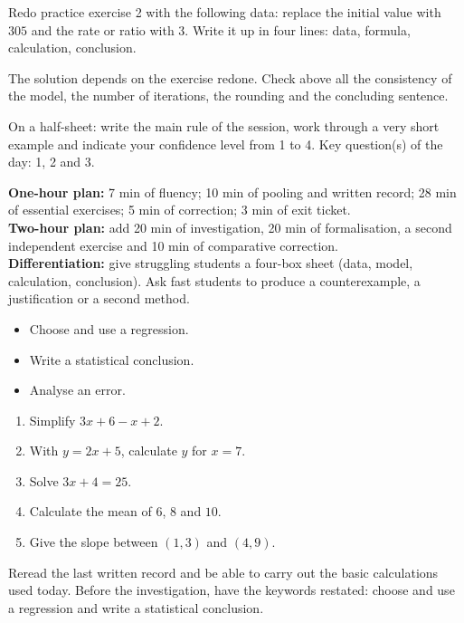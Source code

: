 
\begin{homework}Redo practice exercise 2 with the following data: replace the initial value with $305$ and the rate or ratio with $3$. Write it up in four lines: data, formula, calculation, conclusion.\end{homework}
\begin{solution}The solution depends on the exercise redone. Check above all the consistency of the model, the number of iterations, the rounding and the concluding sentence.\end{solution}

\begin{exitticket}[3 minutes]On a half-sheet: write the main rule of the session, work through a very short example and indicate your confidence level from 1 to 4. Key question(s) of the day: 1, 2 and 3.\end{exitticket}

\ifmxteacher
\begin{method}
\textbf{One-hour plan:} 7 min of fluency; 10 min of pooling and written record; 28 min of essential exercises; 5 min of correction; 3 min of exit ticket.\\
\textbf{Two-hour plan:} add 20 min of investigation, 20 min of formalisation, a second independent exercise and 10 min of comparative correction.\\
\textbf{Differentiation:} give struggling students a four-box sheet (data, model, calculation, conclusion). Ask fast students to produce a counterexample, a justification or a second method.
\end{method}
\fi
{}
\begin{objectives}\begin{itemize}\item Choose and use a regression.\item Write a statistical conclusion.\item Analyse an error.\end{itemize}\end{objectives}
\begin{fluency}\begin{enumerate}\item Simplify $3x+6-x+2$. \item With $y=2x+5$, calculate $y$ for $x=7$. \item Solve $3x+4=25$. \item Calculate the mean of $6$, $8$ and $10$. \item Give the slope between $(1,3)$ and $(4,9)$. \end{enumerate}\end{fluency}
\begin{prerequisites}Reread the last written record and be able to carry out the basic calculations used today. Before the investigation, have the keywords restated: choose and use a regression and write a statistical conclusion.\end{prerequisites}

